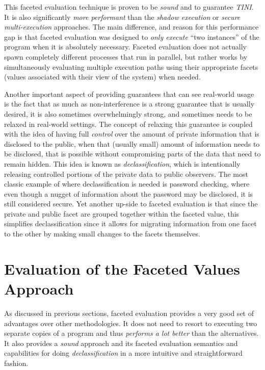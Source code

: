 \documentclass[preprint]{sigplanconf}
\begin{document}
This faceted evaluation technique is proven to be \textit{sound} and to guarantee \textit{TINI}. It is also significantly \textit{more performant} than the \textit{shadow execution} or \textit{secure multi-execution} approaches. The main difference, and reason for this performance gap is that faceted evaluation was designed to \textit{only execute} ``two instances'' of the program when it is absolutely necessary. Faceted evaluation does not actually spawn completely different processes that run in parallel, but rather works by simultaneously evaluating multiple execution paths using their appropriate facets (values associated with their view of the system) when needed.

Another important aspect of providing guarantees that can see real-world usage is the fact that as much as non-interference is a strong guarantee that is usually desired, it is also sometimes overwhelmingly strong, and sometimes needs to be relaxed in real-world settings. The concept of relaxing this guarantee is coupled with the idea of having full \textit{control} over the amount of private information that is disclosed to the public, when that (usually small) amount of information needs to be disclosed, that is possible without compromising parts of the data that need to remain hidden. This idea is known as \textit{declassification}, which is intentionally releasing controlled portions of the private data to public observers. The most classic example of where declassification is needed is password checking, where even though a nugget of information about the password may be disclosed, it is still considered secure. Yet another up-side to faceted evaluation is that since the private and public facet are grouped together within the faceted value, this simplifies declassification since it allows for migrating information from one facet to the other by making small changes to the facets themselves.

\section{Evaluation of the Faceted Values Approach}
\label{sec:4}

As discussed in previous sections, faceted evaluation provides a very good set of advantages over other methodologies. It does not need to resort to executing two separate copies of a program and thus \textit{performs a lot better} than the alternatives. It also provides a \textit{sound} approach and its faceted evaluation semantics and  capabilities for doing  \textit{declassification} in a more intuitive and straightforward fashion.
\end{document}
